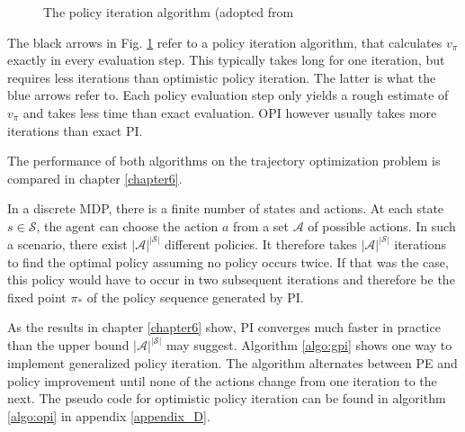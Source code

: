 \begin{figure}[htb]
	\caption{The policy iteration algorithm (adopted from~\cite[section~4.6]{SuttonBarto2018}}
	\label{fig:PI_triangle}
\end{figure}

The black arrows in Fig. \ref{fig:PI_triangle} refer to a policy iteration algorithm, that calculates $v_\pi$ exactly in every evaluation step. This typically takes long for one iteration, but requires less iterations than optimistic policy iteration. The latter is what the blue arrows refer to. Each policy evaluation step only yields a rough estimate of $v_\pi$ and takes less time than exact evaluation. OPI however usually takes more iterations than exact PI.

The performance of both algorithms on the trajectory optimization problem is compared in chapter \ref{chapter6}. \bigbreak

In a discrete MDP, there is a finite number of states and actions. At each state $s \in \mathcal{S}$, the agent can choose the action $a$ from a set $\mathcal{A}$ of possible actions. In such a scenario, there exist $|\mathcal{A}|^{|\mathcal{S}|}$ different policies. It therefore takes $|\mathcal{A}|^{|\mathcal{S}|}$ iterations to find the optimal policy assuming no policy occurs twice. If that was the case, this policy would have to occur in two subsequent iterations and therefore be the fixed point $\pi_*$ of the policy sequence generated by PI.

As the results in chapter \ref{chapter6} show, PI converges much faster in practice than the upper bound $|\mathcal{A}|^{|\mathcal{S}|}$ may suggest. Algorithm \ref{algo:gpi} shows one way to implement generalized policy iteration. The algorithm alternates between PE and policy improvement until none of the actions change from one iteration to the next. The pseudo code for optimistic policy iteration can be found in algorithm \ref{algo:opi} in appendix \ref{appendix_D}.

